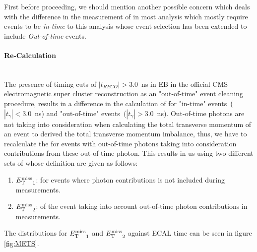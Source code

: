 First before proceeding, we should mention another possible concern which deals with the difference in the measurement of \MET in most analysis which mostly require events to be \textit{in-time} to this
analysis whose event selection has been extended to include \textit{Out-of-time} events.

\paragraph*{\MET Re-Calculation}\mbox{}\\
The presence of timing cuts of $|t_{RECO}| > 3.0$~ns in EB in the official CMS electromagnetic super cluster reconstruction as an "out-of-time" event cleaning procedure, results in a difference in the calculation of \MET for "in-time" events~($|t_{\gamma}| < 3.0$~ns) and "out-of-time" events~($|t_{\gamma}| > 3.0$~ns). Out-of-time photons are not taking into consideration when calculating the total transverse momentum of an event to derived the total transverse momentum imbalance, thus, we have to recalculate the \MET for events with out-of-time photons taking into consideration \pt contributions from these out-of-time photon. This results in us using two different sets of \MET whose   definition are given as follows:
\begin{enumerate}
\item ${E_{\mathrm{T}}^{\text{miss}}}_{1}$: \MET for events where photon \pt contributions is not included during \MET measurements.
\item ${E_{\mathrm{T}}^{\text{miss}}}_{2}$: \MET of the event taking into account out-of-time photon \pt contributions in \MET measurements.
\end{enumerate}
  
The distributions for ${E_{\mathrm{T}}^{\text{miss}}}_{1}$ and ${E_{\mathrm{T}}^{\text{miss}}}_{2}$  against ECAL time can be seen in figure \ref{fig:METS}.

